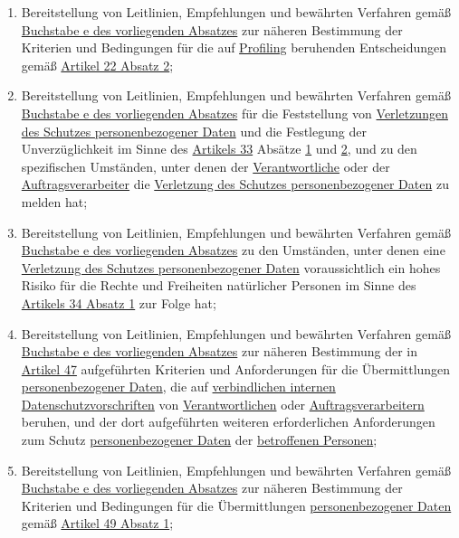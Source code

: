 \begin{enumerate}
\begin{enumerate}
    \item Bereitstellung von Leitlinien, Empfehlungen und bewährten Verfahren gemäß \hyperref[itm:70-1e]{Buchstabe e des
     vorliegenden Absatzes} zur näheren Bestimmung der Kriterien und Bedingungen für die auf \hyperref[itm:04-4]
     {Profiling} beruhenden Entscheidungen gemäß \hyperref[itm:22-2]{Artikel 22 Absatz 2};
    \label{itm:70-1f}

    \item Bereitstellung von Leitlinien, Empfehlungen und bewährten Verfahren gemäß \hyperref[itm:70-1e]{Buchstabe e des
     vorliegenden Absatzes} für die Feststellung von \hyperref[itm:04-12]{Verletzungen des Schutzes personenbezogener
     Daten} und die Festlegung der Unverzüglichkeit im Sinne des \hyperref[ch:33]{Artikels 33} Absätze \hyperref
     [itm:33-1]{1} und
     \hyperref[itm:33-2]{2}, und zu den spezifischen Umständen, unter denen der \hyperref[itm:04-7]
      {Verantwortliche} oder der
     \hyperref[itm:04-8]{Auftragsverarbeiter} die \hyperref[itm:04-12]{Verletzung des Schutzes personenbezogener Daten}
      zu melden hat;
    \label{itm:70-1g}

    \item Bereitstellung von Leitlinien, Empfehlungen und bewährten Verfahren gemäß \hyperref[itm:70-1e]{Buchstabe e des
     vorliegenden Absatzes} zu den Umständen, unter denen eine \hyperref[itm:04-12]{Verletzung des Schutzes
     personenbezogener Daten} voraussichtlich ein hohes Risiko für die Rechte und Freiheiten natürlicher Personen im
     Sinne des \hyperref[itm:34-1]{Artikels 34 Absatz 1} zur Folge hat;
    \label{itm:70-1h}

    \item Bereitstellung von Leitlinien, Empfehlungen und bewährten Verfahren gemäß \hyperref[itm:70-1e]{Buchstabe e des
     vorliegenden Absatzes} zur näheren Bestimmung der in \hyperref[ch:47]{Artikel 47} aufgeführten Kriterien und
     Anforderungen für die Übermittlungen \hyperref[itm:04-1]{personenbezogener Daten}, die auf \hyperref[itm:04-20]
     {verbindlichen internen Datenschutzvorschriften} von \hyperref[itm:04-7]{Verantwortlichen} oder \hyperref
     [itm:04-8]{Auftragsverarbeitern} beruhen, und der dort aufgeführten weiteren erforderlichen Anforderungen zum
     Schutz \hyperref[itm:04-1]{personenbezogener Daten} der \hyperref[itm:04-1]{betroffenen Personen};
    \label{itm:70-1i}

    \item Bereitstellung von Leitlinien, Empfehlungen und bewährten Verfahren gemäß \hyperref[itm:70-1e]{Buchstabe e des
     vorliegenden Absatzes} zur näheren Bestimmung der Kriterien und Bedingungen für die Übermittlungen
     \hyperref[itm:04-1]{personenbezogener Daten} gemäß \hyperref[itm:49-1-1]{Artikel 49 Absatz 1};
    \label{itm:70-1j}


\end{enumerate}
\end{enumerate}
